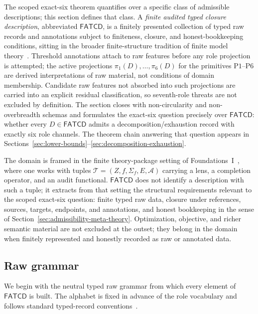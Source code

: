 \documentclass[11pt]{article}
\theoremstyle{definition}
\newcommand{\FATCD}{\ensuremath{\mathsf{FATCD}}}
\newcommand{\Pone}{\ensuremath{\mathrm{P1}}}
\newcommand{\Psix}{\ensuremath{\mathrm{P6}}}
\begin{document}
The scoped exact-six theorem quantifies over a specific class of
admissible descriptions; this section defines that class. A
\emph{finite audited typed closure description}, abbreviated \FATCD{},
is a finitely presented collection of typed raw records and
annotations subject to finiteness, closure, and honest-bookkeeping
conditions, sitting in the broader finite-structure tradition of
finite model theory~\citep{Libkin2004}. Threshold annotations attach to raw features before any
role projection is attempted; the active projections
\(\pi_1(D),\dots,\pi_6(D)\) for the primitives \Pone{}--\Psix{} are
derived interpretations of raw material, not conditions of domain
membership. Candidate raw features not absorbed into such projections
are carried into an explicit residual classification, so seventh-role
threats are not excluded by definition. The section closes with
non-circularity and non-overbreadth schemas and formulates the
exact-six question precisely over \FATCD{}: whether every
\(D \in \FATCD{}\) admits a decomposition/exhaustion record with
exactly six role channels. The theorem chain answering that question
appears in
Sections~\ref{sec:lower-bounds}--\ref{sec:decomposition-exhaustion}.

The domain is framed in the finite theory-package setting of
Foundations~I~\citep{Tsiokos2026SixBirdsFoundations}, where one works
with tuples \(\mathcal{T} = (Z, f, \Sigma_f, E, \mathcal{A})\)
carrying a lens, a completion operator, and an audit functional. \FATCD{} does not
identify a description with such a tuple; it extracts from that
setting the structural requirements relevant to the scoped exact-six
question: finite typed raw data, closure under references, sources,
targets, endpoints, and annotations, and honest bookkeeping in the
sense of Section~\ref{sec:admissibility-meta-theory}. Optimization,
objective, and richer semantic material are not excluded at the
outset; they belong in the domain when finitely represented and
honestly recorded as raw or annotated data.

\subsection{Raw grammar}\label{subsec:raw-grammar}

We begin with the neutral typed raw grammar from which every element
of \FATCD{} is built. The alphabet is fixed in advance of the role
vocabulary and follows standard typed-record
conventions~\citep{CardelliMitchell1991}.
\end{document}
